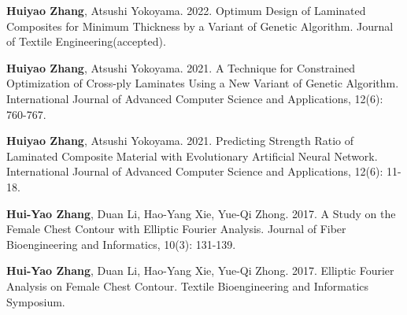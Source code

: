 




\begin{cvpubs}

	\textbf{Huiyao Zhang}, Atsushi Yokoyama. 2022. Optimum Design of
	Laminated Composites for Minimum Thickness by a Variant of Genetic
Algorithm. Journal of Textile Engineering(accepted). 
	
		\textbf{Huiyao Zhang}, Atsushi Yokoyama. 2021. A Technique for
		Constrained Optimization of Cross-ply Laminates Using a New Variant of
	Genetic Algorithm. International Journal of Advanced Computer Science and Applications, 12(6): 760-767. 

		\textbf{Huiyao Zhang}, Atsushi Yokoyama. 2021. Predicting Strength
	Ratio of Laminated Composite Material with Evolutionary Artificial Neural
	Network. International Journal of Advanced Computer Science and Applications,
12(6): 11-18. 

		\textbf{Hui-Yao Zhang}, Duan Li, Hao-Yang Xie, Yue-Qi Zhong. 2017.
	A Study on the Female Chest Contour with Elliptic Fourier Analysis.
Journal of Fiber Bioengineering and Informatics, 10(3): 131-139.  %

		\textbf{Hui-Yao Zhang}, Duan Li, Hao-Yang Xie, Yue-Qi Zhong. 2017.
	Elliptic Fourier Analysis on Female Chest Contour. Textile Bioengineering
		and Informatics Symposium. 
\end{cvpubs}







